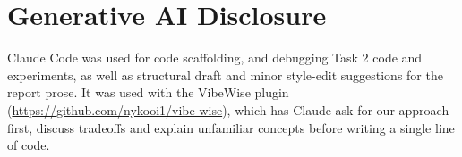 \documentclass{article}
\begin{document}
\begin{table}[!htbp]
  \centering
  \caption{Validation results of the final configuration per seed and for the five-seed ensemble. The ensemble's $\mathcal P$ and $\mathcal E$ are summed over the five members retrained on all observations.}
  \label{tab:t2-final}
  \small
  
\end{table}




\appendix

\section{Generative AI Disclosure}
\label{app:ai}

Claude Code was used for code scaffolding, and debugging Task 2 code and experiments, as well as structural draft and minor style-edit suggestions for the report prose. It was used with the VibeWise plugin (\url{https://github.com/nykooi1/vibe-wise}), which has Claude ask for our approach first, discuss tradeoffs and explain unfamiliar concepts before writing a single line of code.
\end{document}
